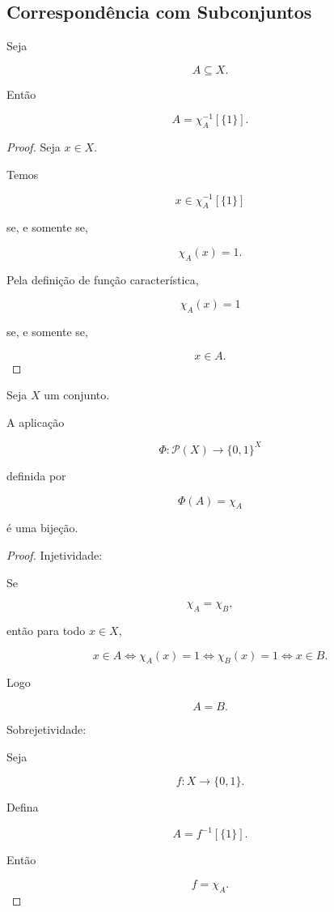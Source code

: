 \documentclass[../../main]{subfiles}
\begin{document}
\subsection{Correspondência com Subconjuntos}

\begin{prop}
	\label{prop:matematica:funcoes:caracteristicas:recuperacao}

	Seja

	\[
		A\subseteq X.
	\]

	Então

	\[
		A
		=
		\chi_A^{-1}[\{1\}].
	\]

\end{prop}

\begin{proof}

	Seja \(x\in X\).

	Temos

	\[
		x\in\chi_A^{-1}[\{1\}]
	\]

	se, e somente se,

	\[
		\chi_A(x)=1.
	\]

	Pela definição de função característica,

	\[
		\chi_A(x)=1
	\]

	se, e somente se,

	\[
		x\in A.
	\]

\end{proof}

\begin{prop}
	\label{prop:matematica:funcoes:caracteristicas:bijeccao}

	Seja \(X\) um conjunto.

	A aplicação

	\[
		\Phi
		:
		\mathcal P(X)
		\to
		\{0,1\}^X
	\]

	definida por

	\[
		\Phi(A)=\chi_A
	\]

	é uma bijeção.

\end{prop}

\begin{proof}

	Injetividade:

	Se

	\[
		\chi_A=\chi_B,
	\]

	então para todo \(x\in X\),

	\[
		x\in A
		\iff
		\chi_A(x)=1
		\iff
		\chi_B(x)=1
		\iff
		x\in B.
	\]

	Logo

	\[
		A=B.
	\]

	Sobrejetividade:

	Seja

	\[
		f:X\to\{0,1\}.
	\]

	Defina

	\[
		A=f^{-1}[\{1\}].
	\]

	Então

	\[
		f=\chi_A.
	\]

\end{proof}
\end{document}
